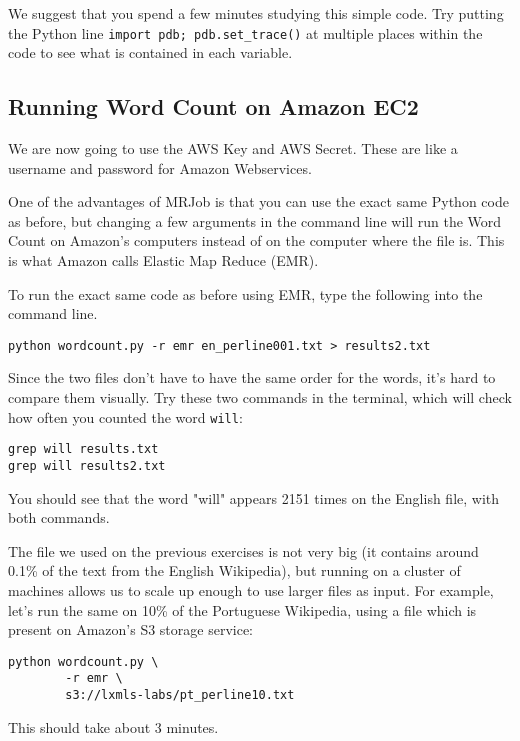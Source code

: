 We suggest that you spend a few minutes studying this simple code. Try putting the Python line \texttt{import pdb; pdb.set\_trace()} at multiple places within the code to see what is contained in each variable.

\subsection{Running Word Count on Amazon EC2}

We are now going to use the AWS Key and AWS Secret. These are like a username and password for Amazon Webservices.

One of the advantages of MRJob is that you can use the exact same Python code as before, but changing a few arguments in the command line will run the Word Count on Amazon's computers instead of on the computer where the file is. This is what Amazon calls Elastic Map Reduce (EMR).

To run the exact same code as before using EMR, type the following into the command line.

\begin{verbatim}
python wordcount.py -r emr en_perline001.txt > results2.txt
\end{verbatim}

Since the two files don't have to have the same order for the words, it's hard to compare them visually. Try these two commands in the terminal, which will check how often you counted the word \texttt{will}:

\begin{verbatim}
grep will results.txt
grep will results2.txt
\end{verbatim}

You should see that the word "will" appears 2151 times on the English file, with both commands.

The file we used on the previous exercises is not very big (it contains around 0.1\% of the text from the English Wikipedia), but running on a cluster of machines allows us to
scale up enough to use larger files as input. For example, let's run the same on 10\% of the Portuguese Wikipedia, using a file which is present on Amazon's S3 storage service:

\begin{verbatim}
python wordcount.py \
        -r emr \
        s3://lxmls-labs/pt_perline10.txt
\end{verbatim}

This should take about 3 minutes.

